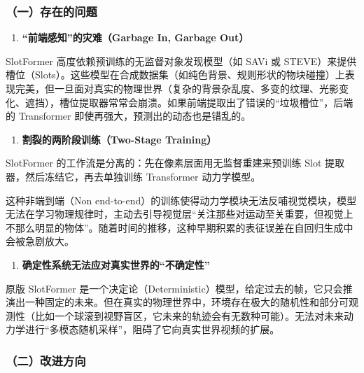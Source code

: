 \hypertarget{ux4e00ux5b58ux5728ux7684ux95eeux9898}{%
\subsubsection{（一）存在的问题}\label{ux4e00ux5b58ux5728ux7684ux95eeux9898}}

\begin{enumerate}
\def\labelenumi{\arabic{enumi}.}
\tightlist
\item
  \textbf{``前端感知''的灾难（Garbage In, Garbage Out）}
\end{enumerate}

SlotFormer 高度依赖预训练的无监督对象发现模型（如 SAVi 或 STEVE）来提供槽位（Slots）。这些模型在合成数据集（如纯色背景、规则形状的物块碰撞）上表现完美，但一旦面对真实的物理世界（复杂的背景杂乱度、多变的纹理、光影变化、遮挡），槽位提取器常常会崩溃。如果前端提取出了错误的``垃圾槽位''，后端的 Transformer 即使再强大，预测出的动态也是错乱的。

\begin{enumerate}
\def\labelenumi{\arabic{enumi}.}
\setcounter{enumi}{1}
\tightlist
\item
  \textbf{割裂的两阶段训练（Two-Stage Training）}
\end{enumerate}

SlotFormer 的工作流是分离的：先在像素层面用无监督重建来预训练 Slot 提取器，然后冻结它，再去单独训练 Transformer 动力学模型。

这种非端到端（Non end-to-end）的训练使得动力学模块无法反哺视觉模块，模型无法在学习物理规律时，主动去引导视觉层``关注那些对运动至关重要，但视觉上不那么明显的物体''。随着时间的推移，这种早期积累的表征误差在自回归生成中会被急剧放大。

\begin{enumerate}
\def\labelenumi{\arabic{enumi}.}
\setcounter{enumi}{2}
\tightlist
\item
  \textbf{确定性系统无法应对真实世界的``不确定性''}
\end{enumerate}

原版 SlotFormer 是一个决定论（Deterministic）模型，给定过去的帧，它只会推演出一种固定的未来。但在真实的物理世界中，环境存在极大的随机性和部分可观测性（比如一个球滚到视野盲区，它未来的轨迹会有无数种可能）。无法对未来动力学进行``多模态随机采样''，阻碍了它向真实世界视频的扩展。

\hypertarget{ux4e8cux6539ux8fdbux65b9ux5411}{%
\subsubsection{（二）改进方向}\label{ux4e8cux6539ux8fdbux65b9ux5411}}

